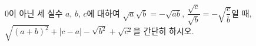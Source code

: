$0$이 아닌 세 실수 $a$, $b$, $c$에 대하여 $\sqrt{a}\sqrt{b}=-\sqrt{ab}$, $\dfrac{\sqrt{c}}{\sqrt{b}}=-\sqrt{\dfrac{c}{b}}$일 때, $\sqrt{(a+b)^2}+|c-a|-\sqrt{b^2}+\sqrt{c^2}$을 간단히 하시오.
